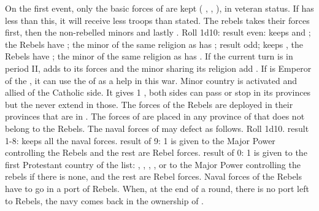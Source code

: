\begin{digressions}
  \phevnt
  \aparag On the first event, only the basic forces of \FRA are kept (\ARMY
  \faceplus, \ARMY \facemoins, \DT), in veteran status.  If \FRA has less than
  this, it will receive less troops than stated. The rebels takes their forces
  first, then the non-rebelled minors and lastly \FRA.
  \aparag Roll 1d10:
  \bparag result even: \FRA keeps \ARMY \facemoins and \DT; the Rebels have
  \ARMY \facemoins; the minor of the same religion as \FRA has \ARMY
  \facemoins;
  \bparag result odd; \FRA keeps \DT, the Rebels have \ARMY \faceplus; the
  minor of the same religion as \FRA has \ARMY \facemoins.
  \aparag If the current turn is in period II, \FRA adds \ARMY \facemoins to
  its forces and the minor sharing its religion add \DT.
  \aparag If \FRA is Emperor of the \HRE, it can use the \ARMY of \HRE as a
  help in this war.
  \aparag Minor country \paysLorraine is activated and allied of the Catholic
  side. It gives 1 \DT, both sides can pass or stop in its provinces but the
  \REVOLT never extend in those.
  \aparag The forces of the Rebels are deployed in their provinces that are in
  \REVOLT .  The forces of \FRA are placed in any province of \FRA that does
  not belong to the Rebels.
  \aparag The naval forces of \FRA may defect as follows. Roll 1d10.
  \bparag result 1-8: \FRA keeps all the naval forces.
  \bparag result of 9: 1 \DN is given to the Major Power controlling the
  Rebels and the rest are Rebel forces.
  \bparag result of 0: 1 \DN is given to the first Protestant country of the
  list: \ANG, \HOL, \SUE, \POL, or to the Major Power controlling the rebels
  if there is none, and the rest are Rebel forces.
  \bparag Naval forces of the Rebels have to go in a port of Rebels.  When, at
  the end of a round, there is no port left to Rebels, the navy comes back in
  the ownership of \FRA.


\end{digressions}
